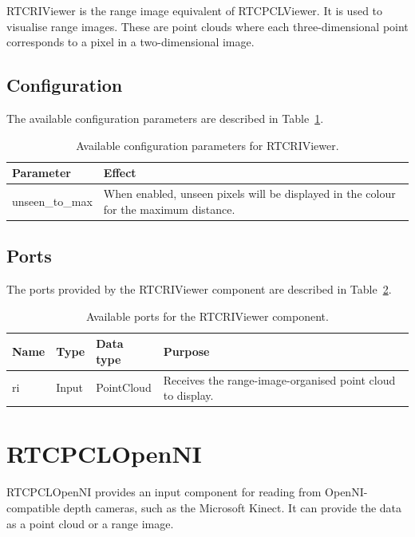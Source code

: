 \documentclass[a4paper,10pt]{article}
\begin{document}
RTCRIViewer is the range image equivalent of RTCPCLViewer. It is used to
visualise range images. These are point clouds where each three-dimensional
point corresponds to a pixel in a two-dimensional image.

\subsection{Configuration}
\label{sec1:riviewer_configuration}

The available configuration parameters are described in
Table~\ref{tab:riviewer_config_params}.

\begin{table}[t]
  \centering
  \begin{tabularx}{\columnwidth}{lX}
    \toprule
    Parameter & Effect \\
    \midrule
    unseen\_to\_max & When enabled, unseen pixels will be displayed in the colour for the maximum distance. \\
    \bottomrule
  \end{tabularx}
  \caption{Available configuration parameters for RTCRIViewer.}
  \label{tab:riviewer_config_params}
\end{table}

\subsection{Ports}
\label{sec1:riviewer_port}

The ports provided by the RTCRIViewer component are described in Table~\ref{tab:riviewer_ports}.

\begin{table}[t]
  \centering
  \begin{tabularx}{\columnwidth}{lllX}
    \toprule
    Name & Type & Data type & Purpose \\
    \midrule
    ri & Input & PointCloud & Receives the range-image-organised point cloud to display. \\
    \bottomrule
  \end{tabularx}
  \caption{Available ports for the RTCRIViewer component.}
  \label{tab:riviewer_ports}
\end{table}

\section{RTCPCLOpenNI}
\label{sec:rtcpclopenni}

RTCPCLOpenNI provides an input component for reading from OpenNI-compatible
depth cameras, such as the Microsoft Kinect. It can provide the data as a point
cloud or a range image.
\end{document}
